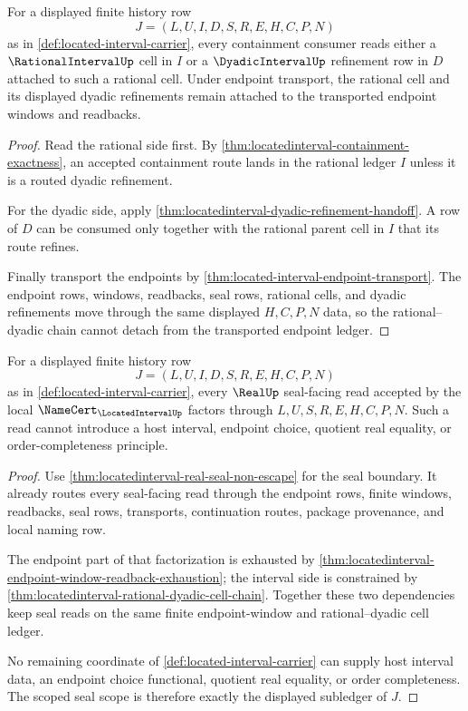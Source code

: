 \begin{theorem}
\label{thm:locatedinterval-rational-dyadic-cell-chain}
For a displayed finite history row
$$
J=(L,U,I,D,S,R,E,H,C,P,N)
$$
as in \autoref{def:located-interval-carrier}, every containment consumer reads either a $\RationalIntervalUp$ cell in $I$ or a $\DyadicIntervalUp$ refinement row in $D$ attached to such a rational cell. Under endpoint transport, the rational cell and its displayed dyadic refinements remain attached to the transported endpoint windows and readbacks.
\end{theorem}
\begin{proof}
Read the rational side first. By \autoref{thm:locatedinterval-containment-exactness}, an accepted containment route lands in the rational ledger $I$ unless it is a routed dyadic refinement.

For the dyadic side, apply \autoref{thm:locatedinterval-dyadic-refinement-handoff}. A row of $D$ can be consumed only together with the rational parent cell in $I$ that its route refines.

Finally transport the endpoints by \autoref{thm:located-interval-endpoint-transport}. The endpoint rows, windows, readbacks, seal rows, rational cells, and dyadic refinements move through the same displayed $H,C,P,N$ data, so the rational--dyadic chain cannot detach from the transported endpoint ledger.
\end{proof}

\begin{theorem}
\label{thm:locatedinterval-scoped-real-seal-scope}
For a displayed finite history row
$$
J=(L,U,I,D,S,R,E,H,C,P,N)
$$
as in \autoref{def:located-interval-carrier}, every $\RealUp$ seal-facing read accepted by the local $\NameCert_{\LocatedIntervalUp}$ factors through $L,U,S,R,E,H,C,P,N$. Such a read cannot introduce a host interval, endpoint choice, quotient real equality, or order-completeness principle.
\end{theorem}
\begin{proof}
Use \autoref{thm:locatedinterval-real-seal-non-escape} for the seal boundary. It already routes every seal-facing read through the endpoint rows, finite windows, readbacks, seal rows, transports, continuation routes, package provenance, and local naming row.

The endpoint part of that factorization is exhausted by \autoref{thm:locatedinterval-endpoint-window-readback-exhaustion}; the interval side is constrained by \autoref{thm:locatedinterval-rational-dyadic-cell-chain}. Together these two dependencies keep seal reads on the same finite endpoint-window and rational--dyadic cell ledger.

No remaining coordinate of \autoref{def:located-interval-carrier} can supply host interval data, an endpoint choice functional, quotient real equality, or order completeness. The scoped seal scope is therefore exactly the displayed subledger of $J$.
\end{proof}

